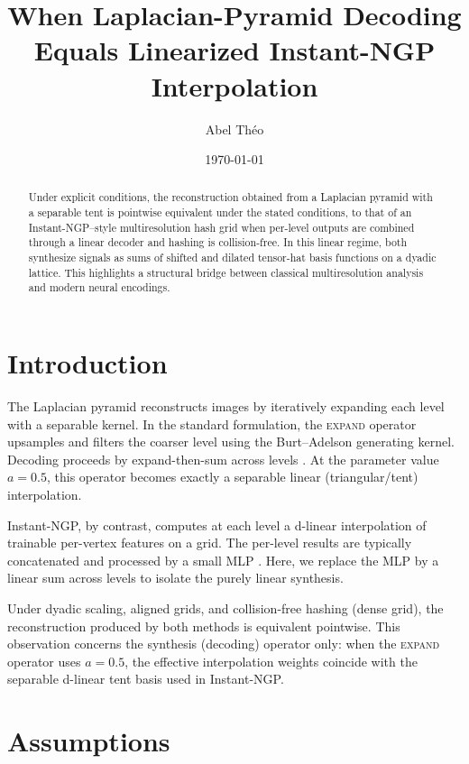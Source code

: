 \documentclass[a4paper,11pt,oneside]{article}
\title{When Laplacian-Pyramid Decoding Equals Linearized Instant-NGP Interpolation}
\author{Abel Théo}
\date{\today}
\numberwithin{equation}{section}
\begin{document}
\maketitle

\begin{abstract}
Under explicit conditions, the reconstruction obtained from a Laplacian pyramid with a separable tent is pointwise equivalent under the stated conditions, to that of an Instant-NGP–style multiresolution hash grid when per-level outputs are combined through a linear decoder and hashing is collision-free. In this linear regime, both synthesize signals as sums of shifted and dilated tensor-hat basis functions on a dyadic lattice. This highlights a structural bridge between classical multiresolution analysis and modern neural encodings.
\end{abstract}

\section{Introduction}

The Laplacian pyramid reconstructs images by iteratively expanding each level with a separable kernel. In the standard formulation, the \textsc{expand} operator upsamples and filters the coarser level using the Burt--Adelson generating kernel. Decoding proceeds by expand-then-sum across levels \cite{burt1983laplacian}. At the parameter value $a=0.5$, this operator becomes exactly a separable linear (triangular/tent) interpolation. 

Instant-NGP, by contrast, computes at each level a d-linear interpolation of trainable per-vertex features on a grid. The per-level results are typically concatenated and processed by a small MLP \cite{mueller2022instant}. Here, we replace the MLP by a linear sum across levels to isolate the purely linear synthesis. 

Under dyadic scaling, aligned grids, and collision-free hashing (dense grid), the reconstruction produced by both methods is equivalent pointwise. This observation concerns the synthesis (decoding) operator only: when the \textsc{expand} operator uses $a=0.5$, the effective interpolation weights coincide with the separable d-linear tent basis used in Instant-NGP. 


\section{Assumptions}
\label{assumptions}
\end{document}
